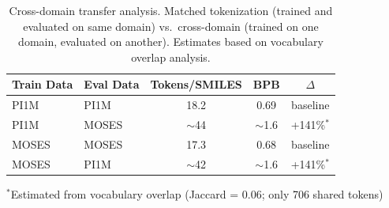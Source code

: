 
\begin{table}[t]
\caption{Cross-domain transfer analysis. Matched tokenization (trained and evaluated on same domain) vs.\ cross-domain (trained on one domain, evaluated on another). Estimates based on vocabulary overlap analysis.}
\label{tab:cross_domain}
\vskip 0.1in
\begin{center}
\begin{small}
\begin{tabular}{llccc}
\toprule
Train Data & Eval Data & Tokens/SMILES & BPB & $\Delta$ \\
\midrule
PI1M & PI1M & 18.2 & 0.69 & baseline \\
PI1M & MOSES & $\sim$44 & $\sim$1.6 & +141\%$^*$ \\
MOSES & MOSES & 17.3 & 0.68 & baseline \\
MOSES & PI1M & $\sim$42 & $\sim$1.6 & +141\%$^*$ \\
\bottomrule
\end{tabular}
\end{small}
\end{center}
{\footnotesize $^*$Estimated from vocabulary overlap (Jaccard = 0.06; only 706 shared tokens)}
\vskip -0.1in
\end{table}
